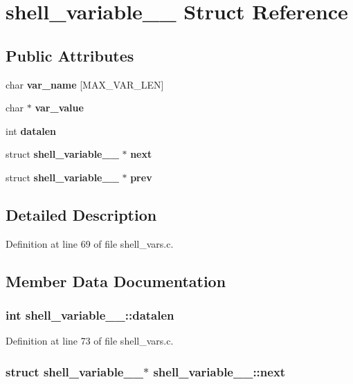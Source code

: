 \section{shell\_\-variable\_\-\_\- Struct Reference}
\label{structshell__variable____}
\subsection*{Public Attributes}
\begin{DoxyCompactItemize}
\item 
char {\bf var\_\-name} [MAX\_\-VAR\_\-LEN]
\item 
char $\ast$ {\bf var\_\-value}
\item 
int {\bf datalen}
\item 
struct {\bf shell\_\-variable\_\-\_\-} $\ast$ {\bf next}
\item 
struct {\bf shell\_\-variable\_\-\_\-} $\ast$ {\bf prev}
\end{DoxyCompactItemize}


\subsection{Detailed Description}


Definition at line 69 of file shell\_\-vars.c.

\subsection{Member Data Documentation}
\subsubsection[{datalen}]{\setlength{\rightskip}{0pt plus 5cm}int {\bf shell\_\-variable\_\-\_\-::datalen}}\label{structshell__variable_____a6f5d028f344b6409880a78b60c6bdc1c}


Definition at line 73 of file shell\_\-vars.c.
\subsubsection[{next}]{\setlength{\rightskip}{0pt plus 5cm}struct {\bf shell\_\-variable\_\-\_\-}$\ast$ {\bf shell\_\-variable\_\-\_\-::next}\hspace{0.3cm}{\ttfamily  [read]}}\label{structshell__variable_____adf6c563db01cac7c20c4d761a6beaf11}


